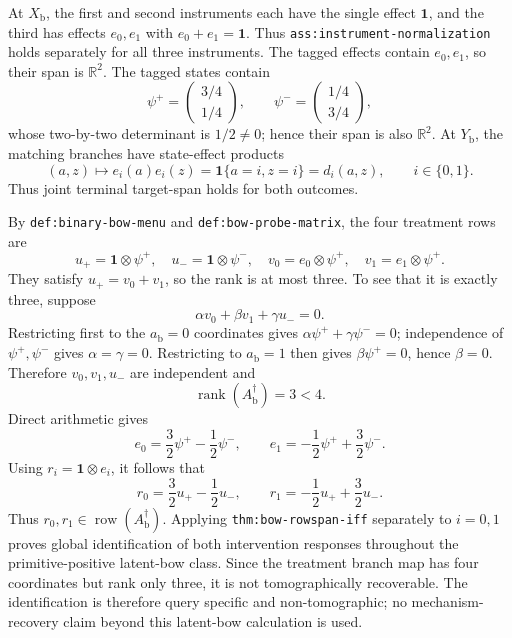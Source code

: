 At \(X_{\mathrm b}\), the first and second instruments each have the single effect \(\mathbf 1\), and the third has effects \(e_0,e_1\) with \(e_0+e_1=\mathbf 1\).  Thus \texttt{ass:instrument-normalization} holds separately for all three instruments.  The tagged effects contain \(e_0,e_1\), so their span is \(\mathbb R^2\).  The tagged states contain
\[
 \psi^+=\begin{pmatrix}3/4\\1/4\end{pmatrix},
 \qquad
 \psi^-=\begin{pmatrix}1/4\\3/4\end{pmatrix},
\]
whose two-by-two determinant is \(1/2\ne0\); hence their span is also \(\mathbb R^2\).  At \(Y_{\mathrm b}\), the matching branches have state-effect products
\[
 (a,z)\longmapsto e_i(a)e_i(z)
 =\mathbf 1\{a=i, z=i\}=d_i(a,z),
 \qquad i\in\{0,1\}.
\]
Thus joint terminal target-span holds for both outcomes.

By \texttt{def:binary-bow-menu} and \texttt{def:bow-probe-matrix}, the four treatment rows are
\[
 u_+=\mathbf 1\otimes\psi^+,
 \quad u_-=\mathbf 1\otimes\psi^-,
 \quad v_0=e_0\otimes\psi^+,
 \quad v_1=e_1\otimes\psi^+.
\]
They satisfy \(u_+=v_0+v_1\), so the rank is at most three.  To see that it is exactly three, suppose
\[
 \alpha v_0+\beta v_1+\gamma u_-=0.
\]
Restricting first to the \(a_{\mathrm b}=0\) coordinates gives \(\alpha\psi^++\gamma\psi^-=0\); independence of \(\psi^+,\psi^-\) gives \(\alpha=\gamma=0\).  Restricting to \(a_{\mathrm b}=1\) then gives \(\beta\psi^+=0\), hence \(\beta=0\).  Therefore \(v_0,v_1,u_-\) are independent and
\[
 \operatorname{rank}(A_{\mathrm b}^{\dagger})=3<4.
\]
Direct arithmetic gives
\[
 e_0=\frac32\psi^+-\frac12\psi^- ,
 \qquad
 e_1=-\frac12\psi^++\frac32\psi^- .
\]
Using \(r_i=\mathbf 1\otimes e_i\), it follows that
\[
 r_0=\frac32u_+-\frac12u_- ,
 \qquad
 r_1=-\frac12u_++\frac32u_- .
\]
Thus \(r_0,r_1\in\operatorname{row}(A_{\mathrm b}^{\dagger})\).  Applying \texttt{thm:bow-rowspan-iff} separately to \(i=0,1\) proves global identification of both intervention responses throughout the primitive-positive latent-bow class.  Since the treatment branch map has four coordinates but rank only three, it is not tomographically recoverable.  The identification is therefore query specific and non-tomographic; no mechanism-recovery claim beyond this latent-bow calculation is used.
